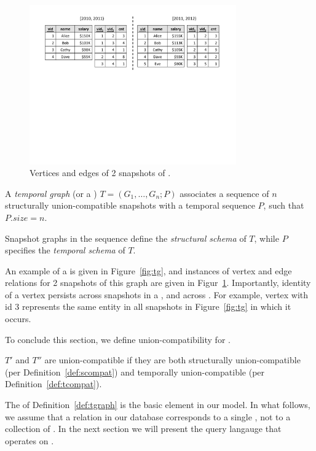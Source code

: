 \begin{figure}
\includegraphics[width=3.5in]{figs/2VE.pdf}
\caption{Vertices and edges of 2 snapshots of .}
\label{fig:2ve}
\end{figure}

\begin{definition} [TGraph]
A {\em temporal graph} (or a {\em \tg}) $T = (G_1, \ldots, G_n; P)$
  associates a sequence of $n$ structurally union-compatible snapshots
  with a temporal sequence $P$, such that $P.size = n$.
\label{def:tgraph} 
\end{definition}

Snapshot graphs in the sequence define the {\em structural schema} of
$T$, while $P$ specifies the {\em temporal schema} of $T$.  

An example of a \tg is given in Figure~\ref{fig:tg}, and instances of
vertex and edge relations for 2 snapshots of this graph are given in
Figur~\ref{fig:2ve}.  Importantly, identity of a vertex persists
across snapshots in a \tg, and across \tgs.  For example, vertex with
id $3$ represents the same entity in all snapshots in
Figure~\ref{fig:tg} in which it occurs.


To conclude this section, we define union-compatibility for \tgs.

\begin{definition} 
\label{def:tuc} 
$T'$ and $T''$ are union-compatible \tgs if they are both structurally
union-compatible (per Definition~\ref{def:scompat}) and temporally
union-compatible (per Definition~\ref{def:tcompat}).
\end{definition}

The \tg of Definition~\ref{def:tgraph} is the basic element in our
model.  In what follows, we assume that a relation in our database
corresponds to a single \tg, not to a collection of \tgs.  In the next
section we will present the \ql query langauge that operates on \tgs.




